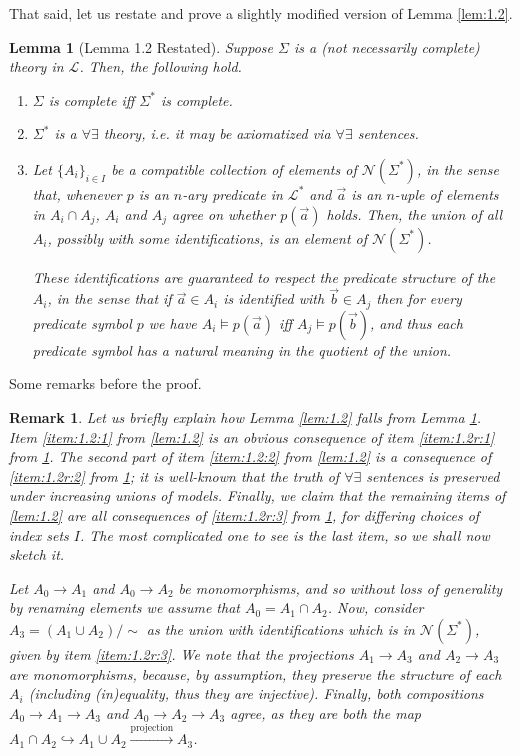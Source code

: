 \documentclass{article}
\newtheorem{lemma}[theorem]{Lemma}
\newtheorem{remark}[theorem]{Remark}
\theoremstyle{nonumberplain}
\newcommand{\Lang}{\mathcal{L}}
\newcommand{\calN}{\mathcal{N}}
\begin{document}
That said, let us restate and prove a slightly modified version of Lemma \ref{lem:1.2}.

\begin{lemma}[Lemma 1.2 Restated]\label{lem:1.2r}
Suppose $\Sigma$ is a (not necessarily complete) theory in $\Lang$. Then, the following hold.
\begin{enumerate}
\item\label{item:1.2r:1} $\Sigma$ is complete iff $\Sigma^*$ is complete.
\item\label{item:1.2r:2} $\Sigma^*$ is a $\forall \exists$ theory, i.e. it may be axiomatized via $\forall\exists$ sentences.
\item\label{item:1.2r:3} Let $\{A_i\}_{i \in I}$ be a compatible collection of elements of $\calN(\Sigma^*)$, in the sense that, whenever $p$ is an $n$-ary predicate in $\Lang^*$ and $\vec a$ is an $n$-uple of elements in $A_i \cap A_j$, $A_i$ and $A_j$ agree on whether $p(\vec a)$ holds. Then, the union of all $A_i$, possibly with some identifications, is an element of $\calN(\Sigma^*)$.

These identifications are guaranteed to respect the predicate structure of the $A_i$, in the sense that if $\vec a \in A_i$ is identified with $\vec b \in A_j$ then for every predicate symbol $p$ we have $A_i \vDash p(\vec a)$ iff $A_j \vDash p(\vec b)$, and thus each predicate symbol has a natural meaning in the quotient of the union.
\end{enumerate}
\end{lemma}

Some remarks before the proof.

\begin{remark}
Let us briefly explain how Lemma \ref{lem:1.2} falls from Lemma \ref{lem:1.2r}. Item \ref{item:1.2:1} from \ref{lem:1.2} is an obvious consequence of item \ref{item:1.2r:1} from \ref{lem:1.2r}. The second part of item \ref{item:1.2:2} from \ref{lem:1.2} is a consequence of \ref{item:1.2r:2} from \ref{lem:1.2r}; it is well-known that the truth of $\forall\exists$ sentences is preserved under increasing unions of models. Finally, we claim that the remaining items of \ref{lem:1.2} are all consequences of \ref{item:1.2r:3} from \ref{lem:1.2r}, for differing choices of index sets $I$. The most complicated one to see is the last item, so we shall now sketch it.

Let $A_0 \to A_1$ and $A_0 \to A_2$ be monomorphisms, and so without loss of generality by renaming elements we assume that $A_0 = A_1 \cap A_2$. Now, consider $A_3 = (A_1 \cup A_2)/\sim$ as the union with identifications which is in $\calN(\Sigma^*)$, given by item \ref{item:1.2r:3}. We note that the projections $A_1 \to A_3$ and $A_2 \to A_3$ are monomorphisms, because, by assumption, they preserve the structure of each $A_i$ (including (in)equality, thus they are injective). Finally, both compositions $A_0 \to A_1 \to A_3$ and $A_0 \to A_2 \to A_3$ agree, as they are both the map ${A_1 \cap A_2 \hookrightarrow A_1 \cup A_2 \xrightarrow{\text{projection}} A_3}$.
\end{remark}
\end{document}
